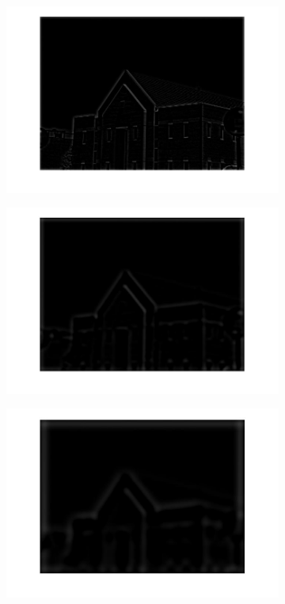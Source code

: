 \documentclass[a4paper]{iacas}
\begin{document}
\begin{figure}[!htbp]
	
	\begin{subfigure}[b]{0.23\textwidth}
		\includegraphics[width=\textwidth]{LoG1.jpg}
		\caption{}
		\label{fig:LoG1}
	\end{subfigure}
	\begin{subfigure}[b]{0.23\textwidth}
		\includegraphics[width=\textwidth]{LoG2.jpg}
		\caption{}
		\label{fig:LoG2}
	\end{subfigure}
	\begin{subfigure}[b]{0.23\textwidth}
		\includegraphics[width=\textwidth]{LoG3.jpg}

\end{subfigure}
\end{figure}
\end{document}
